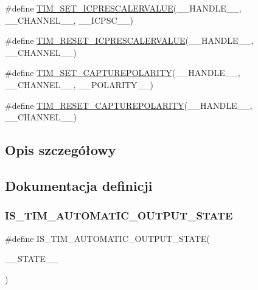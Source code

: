 \begin{DoxyCompactItemize}
\item 
\#define \hyperlink{group___t_i_m___private___macros_ga99724157918ca8b4d8babee1d8008dcb}{T\+I\+M\+\_\+\+S\+E\+T\+\_\+\+I\+C\+P\+R\+E\+S\+C\+A\+L\+E\+R\+V\+A\+L\+UE}(\+\_\+\+\_\+\+H\+A\+N\+D\+L\+E\+\_\+\+\_\+,  \+\_\+\+\_\+\+C\+H\+A\+N\+N\+E\+L\+\_\+\+\_\+,  \+\_\+\+\_\+\+I\+C\+P\+S\+C\+\_\+\+\_\+)
\item 
\#define \hyperlink{group___t_i_m___private___macros_ga18ded32faf42c8981c8d2970bb02e126}{T\+I\+M\+\_\+\+R\+E\+S\+E\+T\+\_\+\+I\+C\+P\+R\+E\+S\+C\+A\+L\+E\+R\+V\+A\+L\+UE}(\+\_\+\+\_\+\+H\+A\+N\+D\+L\+E\+\_\+\+\_\+,  \+\_\+\+\_\+\+C\+H\+A\+N\+N\+E\+L\+\_\+\+\_\+)
\item 
\#define \hyperlink{group___t_i_m___private___macros_ga4321d7371ca3a8c18f96e925667a7b2f}{T\+I\+M\+\_\+\+S\+E\+T\+\_\+\+C\+A\+P\+T\+U\+R\+E\+P\+O\+L\+A\+R\+I\+TY}(\+\_\+\+\_\+\+H\+A\+N\+D\+L\+E\+\_\+\+\_\+,  \+\_\+\+\_\+\+C\+H\+A\+N\+N\+E\+L\+\_\+\+\_\+,  \+\_\+\+\_\+\+P\+O\+L\+A\+R\+I\+T\+Y\+\_\+\+\_\+)
\item 
\#define \hyperlink{group___t_i_m___private___macros_gada7535acf7e1f9b3e8e1dcca848871db}{T\+I\+M\+\_\+\+R\+E\+S\+E\+T\+\_\+\+C\+A\+P\+T\+U\+R\+E\+P\+O\+L\+A\+R\+I\+TY}(\+\_\+\+\_\+\+H\+A\+N\+D\+L\+E\+\_\+\+\_\+,  \+\_\+\+\_\+\+C\+H\+A\+N\+N\+E\+L\+\_\+\+\_\+)
\end{DoxyCompactItemize}


\subsection{Opis szczegółowy}


\subsection{Dokumentacja definicji}
\mbox{\label{group___t_i_m___private___macros_gab060abc03ca5cd3421a9279a5403cea3}} 
\subsubsection{\texorpdfstring{I\+S\+\_\+\+T\+I\+M\+\_\+\+A\+U\+T\+O\+M\+A\+T\+I\+C\+\_\+\+O\+U\+T\+P\+U\+T\+\_\+\+S\+T\+A\+TE}{IS\_TIM\_AUTOMATIC\_OUTPUT\_STATE}}
{\footnotesize\ttfamily \#define I\+S\+\_\+\+T\+I\+M\+\_\+\+A\+U\+T\+O\+M\+A\+T\+I\+C\+\_\+\+O\+U\+T\+P\+U\+T\+\_\+\+S\+T\+A\+TE(\begin{DoxyParamCaption}\item[{}]{\+\_\+\+\_\+\+S\+T\+A\+T\+E\+\_\+\+\_\+ }\end{DoxyParamCaption})}

